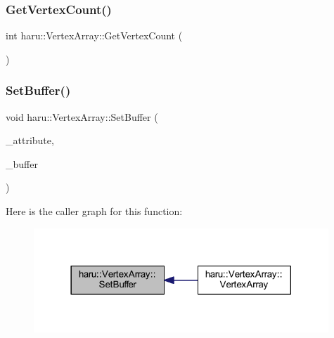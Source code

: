 \mbox{\label{classharu_1_1_vertex_array_af444883400ad80eacbc8bf32d40a51e1}} 
\subsubsection{\texorpdfstring{Get\+Vertex\+Count()}{GetVertexCount()}}
{\footnotesize\ttfamily int haru\+::\+Vertex\+Array\+::\+Get\+Vertex\+Count (\begin{DoxyParamCaption}{ }\end{DoxyParamCaption})}

\mbox{\label{classharu_1_1_vertex_array_aef555fb0ec34f06ed93b9f0d489bf188}} 
\subsubsection{\texorpdfstring{Set\+Buffer()}{SetBuffer()}}
{\footnotesize\ttfamily void haru\+::\+Vertex\+Array\+::\+Set\+Buffer (\begin{DoxyParamCaption}\item[{std\+::string}]{\+\_\+attribute,  }\item[{std\+::shared\+\_\+ptr$<$ \mbox{\hyperlink{classharu_1_1_vertex_buffer}{Vertex\+Buffer}} $>$}]{\+\_\+buffer }\end{DoxyParamCaption})}

Here is the caller graph for this function\+:
\nopagebreak
\begin{figure}[H]
\begin{center}
\leavevmode
\includegraphics[width=314pt]{classharu_1_1_vertex_array_aef555fb0ec34f06ed93b9f0d489bf188_icgraph}
\end{center}
\end{figure}
\mbox{\label{classharu_1_1_vertex_array_a8ca455fffbc9f554851fe18eb8a26bfa}} 

